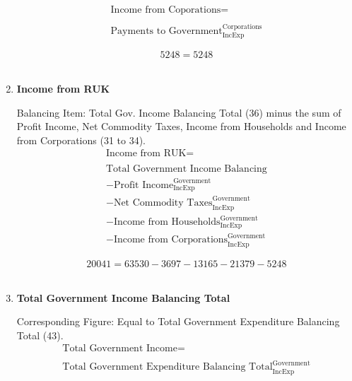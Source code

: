 \begin{enumerate}
\begin{equation}
\begin{split}
\text{Income from Coporations} =  \\ \\
\text{Payments to Government}^\text{Corporations}_\text{IncExp}
\end{split} \label{eq:2.5.38}
\end{equation}

\begin{equation} \nonumber
5248 = 5248
\end{equation}\\


\item \textbf {Income from RUK}

Balancing Item: Total Gov. Income Balancing Total (36) minus the sum of Profit Income, Net Commodity Taxes, Income from Households and Income from Corporations (31 to 34).\\

\begin{equation}
\begin{split}
\text{Income from RUK} =  \\ \\
\text{Total Government Income Balancing}\\
-\text{Profit Income}^\text{Government}_\text{IncExp}\\
-\text{Net Commodity Taxes}^\text{Government}_\text{IncExp}\\
-\text{Income from Households}^\text{Government}_\text{IncExp}\\
-\text{Income from Corporations}^\text{Government}_\text{IncExp}
\end{split} \label{eq:2.5.39}
\end{equation}

\begin{equation} \nonumber
20041 = 63530-3697-13165-21379-5248
\end{equation}\\


\item \textbf {Total Government Income Balancing Total}

Corresponding Figure: Equal to Total Government Expenditure Balancing Total (43).\\

\begin{equation}
\begin{split}
\text{Total Government Income} =  \\ \\
\text{Total Government Expenditure Balancing Total}^\text{Government}_\text{IncExp}
\end{split} \label{eq:2.5.40}
\end{equation}


\end{enumerate}
